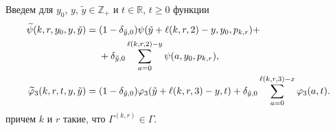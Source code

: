 \documentclass[a4paper,12pt,russian]{extarticle}
\newcommand{\G}{\Gamma}
\newcommand{\ga}[1]{\Gamma^{\left( #1 \right)} }
\begin{document}
Введем для $y_0$, $y$, $\tilde{y} \in \mathbb{Z}_+$ и $t \in \mathbb{R}$, $t\geqslant 0$ функции
\begin{equation}
\begin{aligned}
\widetilde{\psi}(k,r,y_0,y,\tilde{y}) &= 
\begin{aligned}[t]
&(1 - \delta_{\tilde{y},0}) \psi(\tilde{y}+\ell(k,r,2)-y,y_0, p_{k,r})  +\\
&+ \delta_{\tilde{y},0}\sum_{a=0}^{\ell(k,r,2)-y} \psi(a,y_0, p_{k,r}),
\end{aligned}\\
\widetilde{\varphi}_3(k,r,t,y,\tilde{y}) &= (1-\delta_{\tilde{y},0}) \varphi_3(\tilde{y} + \ell(k,r,3)-y,t)  +\delta_{\tilde{y},0}\sum_{a=0}^{\ell(k,r,3)-x} \varphi_3(a,t).
\end{aligned}
\label{tildephi}
\end{equation}
причем $k$ и $r$ такие, что $\ga{k,r}\in \G$.
	
\end{document}

